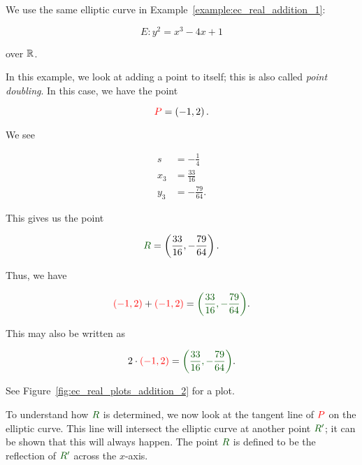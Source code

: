 \begin{example}
\label{example:ec_real_addition_2}
We use the same \gls{elliptic curve} in
Example~\ref{example:ec_real_addition_1}:

\begin{equation}
    E: y^{2} = x^{3} - 4x + 1
\end{equation}

\noindent
over $\mathbb{R}$.

In this example, we look at adding a point to itself;
this is also called \emph{point doubling}.
In this case, we have the point

\begin{equation}
    \textcolor{red}{P} = \left( -1,2 \right).
\end{equation}

\noindent
We see

\begin{align}
    s &= -\frac{1}{4} \nonumber\\
    x_{3} &= \frac{33}{16} \nonumber\\
    y_{3} &= -\frac{79}{64}.
\end{align}

\noindent
This gives us the point

\begin{equation}
    \textcolor[rgb]{0,0.33,0}{R} = \parens{\frac{33}{16},-\frac{79}{64}}.
\end{equation}

\noindent
Thus, we have

\begin{equation}
    \textcolor{red}{\parens{-1,2}} + \textcolor{red}{\parens{-1,2}}
    = \textcolor[rgb]{0,0.33,0}{\parens{\frac{33}{16},-\frac{79}{64}}}.
\end{equation}

\noindent
This may also be written as

\begin{equation}
    2\cdot\textcolor{red}{\parens{-1,2}}
    = \textcolor[rgb]{0,0.33,0}{\parens{\frac{33}{16},-\frac{79}{64}}}.
\end{equation}

\noindent
See Figure~\ref{fig:ec_real_plots_addition_2}
for a plot.

To understand how $\textcolor[rgb]{0,0.33,0}{R}$ is determined,
we now look at the tangent line of $\textcolor{red}{P}$
on the \gls{elliptic curve}.
This line will intersect the \gls{elliptic curve} at another point
$\textcolor[rgb]{0,0.33,0}{R'}$;
it can be shown that this will always happen.
The point $\textcolor[rgb]{0,0.33,0}{R}$ is defined to be
the reflection of $\textcolor[rgb]{0,0.33,0}{R'}$
across the $x$-axis.
\end{example}


